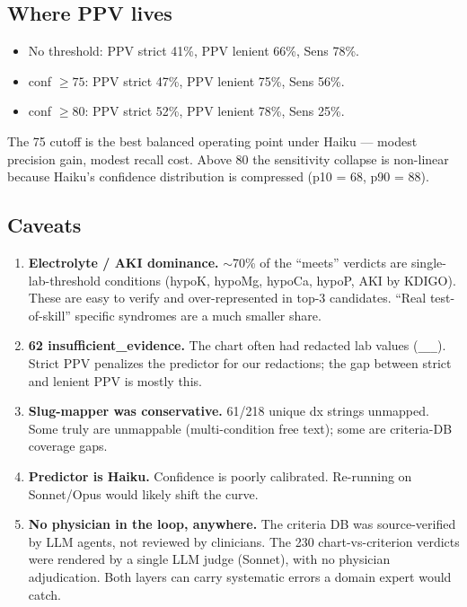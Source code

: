 \documentclass[11pt]{article}
\begin{document}
\subsection{Where PPV lives}
\begin{itemize}[leftmargin=*,nosep]
\item No threshold: PPV strict 41\%, PPV lenient 66\%, Sens 78\%.
\item conf $\geq 75$: PPV strict 47\%, PPV lenient 75\%, Sens 56\%.
\item conf $\geq 80$: PPV strict 52\%, PPV lenient 78\%, Sens 25\%.
\end{itemize}

The 75 cutoff is the best balanced operating point under Haiku --- modest precision
gain, modest recall cost. Above 80 the sensitivity collapse is non-linear because
Haiku's confidence distribution is compressed (p10 = 68, p90 = 88).

\subsection{Caveats}
\begin{enumerate}[leftmargin=*,nosep]
\item \textbf{Electrolyte / AKI dominance.} $\sim$70\% of the ``meets'' verdicts are
    single-lab-threshold conditions (hypoK, hypoMg, hypoCa, hypoP, AKI by KDIGO).
    These are easy to verify and over-represented in top-3 candidates. ``Real
    test-of-skill'' specific syndromes are a much smaller share.
\item \textbf{62 insufficient\_evidence.} The chart often had redacted lab values
    (\texttt{\_\_\_}). Strict PPV penalizes the predictor for our redactions; the gap
    between strict and lenient PPV is mostly this.
\item \textbf{Slug-mapper was conservative.} 61/218 unique dx strings unmapped. Some
    truly are unmappable (multi-condition free text); some are criteria-DB coverage gaps.
\item \textbf{Predictor is Haiku.} Confidence is poorly calibrated. Re-running on
    Sonnet/Opus would likely shift the curve.
\item \textbf{No physician in the loop, anywhere.} The criteria DB was source-verified
    by LLM agents, not reviewed by clinicians. The 230 chart-vs-criterion verdicts
    were rendered by a single LLM judge (Sonnet), with no physician adjudication.
    Both layers can carry systematic errors a domain expert would catch.
\end{enumerate}
\end{document}
